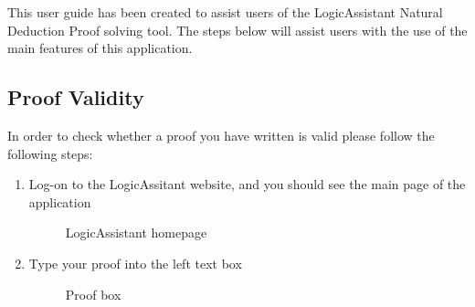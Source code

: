  
This user guide has been created to assist users of the LogicAssistant Natural Deduction Proof solving tool. The steps below will assist users with the use of the main features of this application.

\subsection{Proof Validity}

In order to check whether a proof you have written is valid please follow the following steps:

\begin{enumerate}
	\item Log-on to the LogicAssitant website, and you should see the main page of the application
			\begin{figure}[!ht]
				\centering
				\caption{LogicAssistant homepage}
			\end{figure}
		
		\item Type your proof into the left text box
		
			\begin{figure}[!ht]
				\centering
				\caption{Proof box}
			\end{figure}
		

\end{enumerate}
